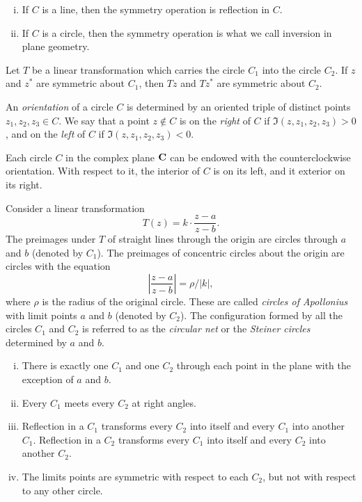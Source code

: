 \begin{proposition}
  \mbox{}
  \begin{enumerate}[(i)]
  \item If $C$ is a line, then the symmetry operation is reflection in $C$.
  \item If $C$ is a circle, then the symmetry operation is what we call inversion in plane geometry.
  \end{enumerate}
\end{proposition}

\begin{proposition}
  Let $T$ be a linear transformation which carries the circle $C_1$ into the circle $C_2$. If $z$ and $z^\ast$ are symmetric about $C_1$, then $T z$ and $T z^\ast$ are symmetric about $C_2$.
\end{proposition}

\begin{definition}
  An \emph{orientation} of a circle $C$ is determined by an oriented triple of distinct points $z_1, z_2, z_3 \in C$. We say that a point $z \notin C$ is on the \emph{right} of $C$ if $\Im(z, z_1, z_2, z_3) > 0$, and on the \emph{left} of $C$ if $\Im(z, z_1, z_2, z_3) < 0$.
\end{definition}

Each circle $C$ in the complex plane $\mathbf{C}$ can be endowed with the counterclockwise orientation. With respect to it, the interior of $C$ is on its left, and it exterior on its right.

\begin{definition}
  Consider a linear transformation
  \[
  T(z) = k \cdot \frac{z-a}{z-b}.
  \]
  The preimages under $T$ of straight lines through the origin are circles through $a$ and $b$ (denoted by $C_1$). The preimages of concentric circles about the origin are circles with the equation
  \[
  \left| \frac{z-a}{z-b} \right| = \rho/|k|,
  \]
  where $\rho$ is the radius of the original circle. These are called \emph{circles of Apollonius} with limit points $a$ and $b$ (denoted by $C_2$). The configuration formed by all the circles $C_1$ and $C_2$ is referred to as the \emph{circular net} or the \emph{Steiner circles} determined by $a$ and $b$.
\end{definition}

\begin{proposition}
  \mbox{}
  \begin{enumerate}[(i)]
  \item There is exactly one $C_1$ and one $C_2$ through each point in the plane with the exception of $a$ and $b$.
  \item Every $C_1$ meets every $C_2$ at right angles.
  \item Reflection in a $C_1$ transforms every $C_2$ into itself and every $C_1$ into another $C_1$. Reflection in a $C_2$ transforms every $C_1$ into itself and every $C_2$ into another $C_2$.
    \item The limits points are symmetric with respect to each $C_2$, but not with respect to any other circle.
  \end{enumerate}
\end{proposition}

